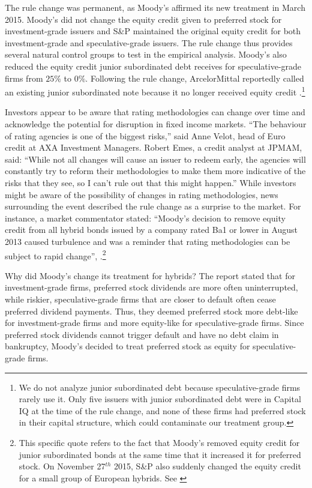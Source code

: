 \documentclass[a4paper, 12pt]{article}
\begin{document}
The rule change was permanent, as Moody's affirmed its new treatment in March 2015. Moody's did not change the equity credit given to preferred stock for investment-grade issuers and S\&P maintained the original equity credit for both investment-grade and speculative-grade issuers. The rule change thus provides several natural control groups to test in the empirical analysis. Moody's also reduced the equity credit junior subordinated debt receives for speculative-grade firms from $25\%$ to $0\%$. Following the rule change, ArcelorMittal reportedly called an existing junior subordinated note because it no longer received equity credit \cite{ipe}.\footnote{We do not analyze junior subordinated debt because speculative-grade firms rarely use it. Only five issuers with junior subordinated debt were in Capital IQ at the time of the rule change, and none of these firms had preferred stock in their capital structure, which could contaminate our treatment group.}


Investors appear to be aware that rating methodologies can change over time and acknowledge the potential for disruption in fixed income markets. ``The behaviour of rating agencies is one of the biggest risks,” said Anne Velot, head of Euro credit at AXA Investment Managers. Robert Emes, a credit analyst at JPMAM, said: “While not all changes will cause an issuer to redeem early, the agencies will constantly try to reform their methodologies to make them more indicative of the risks that they see, so I can’t rule out that this might happen.”  While investors might be aware of the possibility of changes in rating methodologies, news surrounding the event described the rule change as a surprise to the market. For instance, a market commentator stated: ``Moody’s decision to remove equity credit from all hybrid bonds issued by a company rated Ba1 or lower in August 2013 caused turbulence and was a reminder that rating methodologies can be subject to rapid change'', \citep{euromoney}.\footnote{This specific quote refers to the fact that Moody's removed equity credit for junior subordinated bonds at the same time that it increased it for preferred stock. On November 27$^{th}$ 2015, S\&P also suddenly changed the equity credit for a small group of European hybrids. See \cite{euromoney}}

Why did Moody's change its treatment for hybrids? The report stated that for investment-grade firms, preferred stock dividends are more often uninterrupted, while riskier, speculative-grade firms that are closer to default often cease preferred dividend payments. Thus, they deemed preferred stock more debt-like for investment-grade firms and more equity-like for speculative-grade firms. Since preferred stock dividends cannot trigger default and have no debt claim in bankruptcy, Moody's decided to treat preferred stock as equity for speculative-grade firms.
\end{document}
